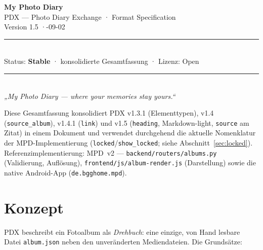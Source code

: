 \documentclass[11pt,a4paper]{article}
\let\mpdtt\texttt
\renewcommand{\texttt}[1]{\mpdtt{\textcolor{mpdred}{#1}}}
\begin{document}

\begin{center}
  {\fontsize{36}{42}\selectfont\bfseries\color{mpdnavy} My Photo Diary}\\[6pt]
  {\fontsize{18}{22}\selectfont\color{mpdslate} PDX — Photo Diary Exchange
   \;·\; Format Specification}\\[8pt]
  {\fontsize{13}{16}\selectfont\color{mpdgrey} Version 1.5 \;·-09-02}\\[8pt]
  {\color{mpdrule}\rule{\linewidth}{1pt}}\\[6pt]
  {\color{mpdgrey}\small Status: \textbf{Stable} \;·\; konsolidierte
   Gesamtfassung \;·\; Lizenz: Open}\\[6pt]
  {\color{mpdrule}\rule{\linewidth}{1pt}}\\[8pt]
  {\itshape\color{mpdnavy} „My Photo Diary — where your memories stay yours.“}
\end{center}

\vspace{4pt}
{\small\color{mpdgrey}
Diese Gesamtfassung konsolidiert PDX v1.3.1 (Elementtypen), v1.4
(\texttt{source\_album}), v1.4.1 (\texttt{link}) und v1.5
(\texttt{heading}, Markdown-light, \texttt{source} am Zitat) in einem
Dokument und
verwendet durchgehend die aktuelle Nomenklatur der MPD-Implementierung
(\texttt{locked}/\texttt{show\_locked}; siehe Abschnitt~\ref{sec:locked}).
Referenzimplementierung: MPD~v2 — \texttt{backend/routers/albums.py}
(Validierung, Auflösung), \texttt{frontend/js/album-render.js}
(Darstellung) sowie die native Android-App (\texttt{de.bgghome.mpd}).}

\tableofcontents

\section{Konzept}

PDX beschreibt ein Fotoalbum als \emph{Drehbuch}: eine einzige, von Hand
lesbare Datei \texttt{album.json} neben den unveränderten Mediendateien.
Die Grundsätze:
\end{document}
